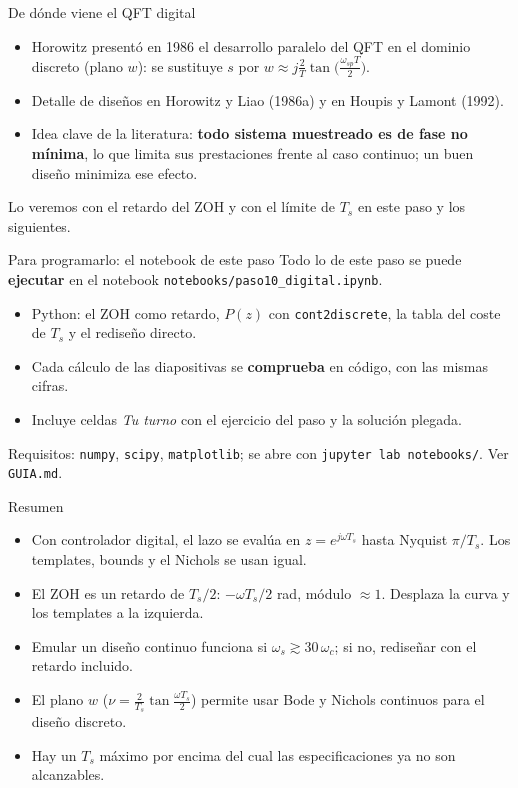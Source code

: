 \documentclass[aspectratio=169,11pt]{beamer}
\begin{document}
\begin{frame}{De dónde viene el QFT digital}
  \small
  \begin{itemize}
    \item Horowitz presentó en 1986 el desarrollo paralelo del QFT en el dominio discreto (plano $w$): se sustituye $s$ por $w\approx j\frac{2}{T}\tan\!\big(\frac{\omega_{sp}T}{2}\big)$.
    \item Detalle de diseños en Horowitz y Liao (1986a) y en Houpis y Lamont (1992).
    \item Idea clave de la literatura: \textbf{todo sistema muestreado es de fase no mínima}, lo que limita sus prestaciones frente al caso continuo; un buen diseño minimiza ese efecto.
  \end{itemize}
  \footnotesize Lo veremos con el retardo del ZOH y con el límite de $T_s$ en este paso y los siguientes.
\end{frame}

\begin{frame}{Para programarlo: el notebook de este paso}
  \small
  Todo lo de este paso se puede \textbf{ejecutar} en el notebook \texttt{notebooks/paso10\_digital.ipynb}.
  \begin{itemize}
    \item Python: el ZOH como retardo, $P(z)$ con \texttt{cont2discrete}, la tabla del coste de $T_s$ y el rediseño directo.
    \item Cada cálculo de las diapositivas se \textbf{comprueba} en código, con las mismas cifras.
    \item Incluye celdas \emph{Tu turno} con el ejercicio del paso y la solución plegada.
  \end{itemize}
  \footnotesize Requisitos: \texttt{numpy}, \texttt{scipy}, \texttt{matplotlib}; se abre con \texttt{jupyter lab notebooks/}. Ver \texttt{GUIA.md}.
\end{frame}

\begin{frame}{Resumen}
  \small
  \begin{itemize}
    \item Con controlador digital, el lazo se evalúa en $z=e^{j\omega T_s}$ hasta Nyquist $\pi/T_s$. Los templates, bounds y el Nichols se usan igual.
    \item El ZOH es un retardo de $T_s/2$: $-\omega T_s/2$ rad, módulo $\approx1$. Desplaza la curva y los templates a la izquierda.
    \item Emular un diseño continuo funciona si $\omega_s\gtrsim30\,\omega_c$; si no, rediseñar con el retardo incluido.
    \item El plano $w$ ($\nu=\frac{2}{T_s}\tan\frac{\omega T_s}{2}$) permite usar Bode y Nichols continuos para el diseño discreto.
    \item Hay un $T_s$ máximo por encima del cual las especificaciones ya no son alcanzables.
  \end{itemize}
\end{frame}
\end{document}
